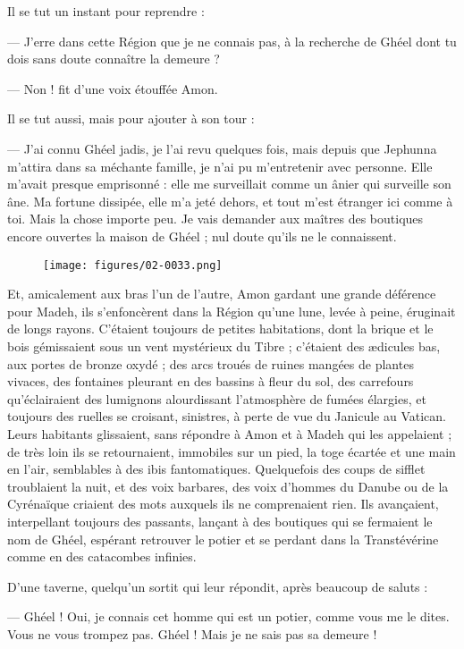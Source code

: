 \documentclass[a4paper, 11pt, oneside, polutonikogreek, french]{article}
\begin{document}
Il se tut un instant pour reprendre :

--- J'erre dans cette Région que je ne connais pas, à la recherche de Ghéel dont tu dois sans doute connaître la demeure ?

--- Non ! fit d'une voix étouffée Amon.

Il se tut aussi, mais pour ajouter à son tour :

--- J'ai connu Ghéel jadis, je l'ai revu quelques fois, mais depuis que Jephunna m'attira dans sa méchante famille, je n'ai pu m'entretenir avec personne. Elle m'avait presque emprisonné : elle me surveillait comme un ânier qui surveille son âne. Ma fortune dissipée, elle m'a jeté dehors, et tout m'est étranger ici comme à toi. Mais la chose importe peu. Je vais demander aux maîtres des boutiques encore ouvertes la maison de Ghéel ; nul doute qu'ils ne le connaissent.
\begin{figure}[H]
\centering
\texttt{[image: figures/02-0033.png]}
\end{figure}
Et, amicalement aux bras l'un de l'autre, Amon gardant une grande déférence pour Madeh, ils s'enfoncèrent dans la Région qu'une lune, levée à peine, éruginait de longs rayons. C'étaient toujours de petites habitations, dont la brique et le bois gémissaient sous un vent mystérieux du Tibre ; c'étaient des ædicules bas, aux portes de bronze oxydé ; des arcs troués de ruines mangées de plantes vivaces, des fontaines pleurant en des bassins à fleur du sol, des carrefours qu'éclairaient des lumignons alourdissant l'atmosphère de fumées élargies, et toujours des ruelles se croisant, sinistres, à perte de vue du Janicule au Vatican. Leurs habitants glissaient, sans répondre à Amon et à Madeh qui les appelaient ; de très loin ils se retournaient, immobiles sur un pied, la toge écartée et une main en l'air, semblables à des ibis fantomatiques. Quelquefois des coups de sifflet troublaient la nuit, et des voix barbares, des voix d'hommes du Danube ou de la Cyrénaïque criaient des mots auxquels ils ne comprenaient rien. Ils avançaient, interpellant toujours des passants, lançant à des boutiques qui se fermaient le nom de Ghéel, espérant retrouver le potier et se perdant dans la Transtévérine comme en des catacombes infinies.

D'une taverne, quelqu'un sortit qui leur répondit, après beaucoup de saluts :

--- Ghéel ! Oui, je connais cet homme qui est un potier, comme vous me le dites. Vous ne vous trompez pas. Ghéel ! Mais je ne sais pas sa demeure !
\end{document}
